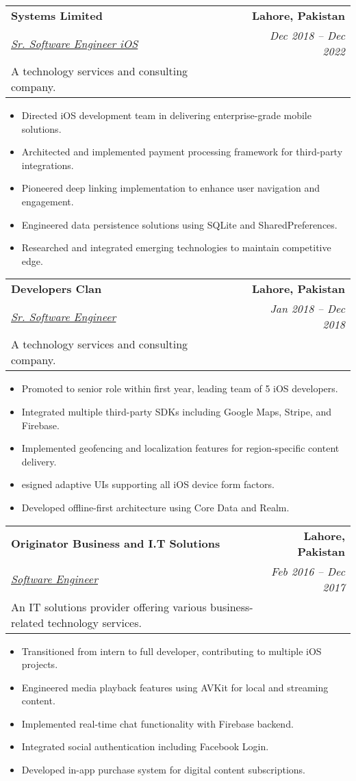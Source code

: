 \documentclass[a4paper,10pt]{article}
\makeatletter
\newcommand{\resumeItem}[1]{
  \item\small{
    {#1 \vspace{-2pt}}
  }
}
\newcommand{\resumeSubheadingExperience}[5]{
  \vspace{-2pt}\item
    \begin{tabular*}{1.0\textwidth}[t]{l@{\extracolsep{\fill}}r}
      \textbf{\large#1} & \textbf{\small #2} \\
      \textit{\underline{#3}} & \textit{\small #4} \\
      {\small#5} & \\
    \end{tabular*}\vspace{-7pt}
}
\newcommand{\resumeSubSubheading}[2]{
    \item
    \begin{tabular*}{0.97\textwidth}{l@{\extracolsep{\fill}}r}
      \textit{\small#1} & \textit{\small #2} \\
    \end{tabular*}\vspace{-7pt}
}
\newcommand{\resumeItemListStart}{\begin{itemize}}
\newcommand{\resumeItemListEnd}{\end{itemize}\vspace{-5pt}}
\makeatother
\begin{document}


    \resumeSubheadingExperience
        {Systems Limited}{Lahore, Pakistan}
        {Sr. Software Engineer iOS}{Dec 2018 -- Dec 2022}
        {A technology services and consulting company.}
        \resumeItemListStart
            \resumeItem{Directed iOS development team in delivering enterprise-grade mobile solutions.}
            \resumeItem{Architected and implemented payment processing framework for third-party integrations.}
            \resumeItem{Pioneered deep linking implementation to enhance user navigation and engagement.}
            \resumeItem{Engineered data persistence solutions using SQLite and SharedPreferences.}
            \resumeItem{Researched and integrated emerging technologies to maintain competitive edge.}
        \resumeItemListEnd

    \resumeSubheadingExperience
        {Developers Clan}{Lahore, Pakistan}
        {Sr. Software Engineer}{Jan 2018 -- Dec 2018}
        {A technology services and consulting company.}
        \resumeItemListStart
            \resumeItem{Promoted to senior role within first year, leading team of 5 iOS developers.}
            \resumeItem{Integrated multiple third-party SDKs including Google Maps, Stripe, and Firebase.}
            \resumeItem{Implemented geofencing and localization features for region-specific content delivery.}
            \resumeItem{esigned adaptive UIs supporting all iOS device form factors.}
            \resumeItem{Developed offline-first architecture using Core Data and Realm.}
        \resumeItemListEnd

    \resumeSubheadingExperience
        {Originator Business and I.T Solutions}{Lahore, Pakistan}
        {Software Engineer}{Feb 2016 -- Dec 2017}
        {An IT solutions provider offering various business-related technology services.}
        \resumeItemListStart
            \resumeItem{Transitioned from intern to full developer, contributing to multiple iOS projects.}
            \resumeItem{Engineered media playback features using AVKit for local and streaming content.}
            \resumeItem{Implemented real-time chat functionality with Firebase backend.}
            \resumeItem{Integrated social authentication including Facebook Login.}
            \resumeItem{Developed in-app purchase system for digital content subscriptions.}
        \resumeItemListEnd
\end{document}
